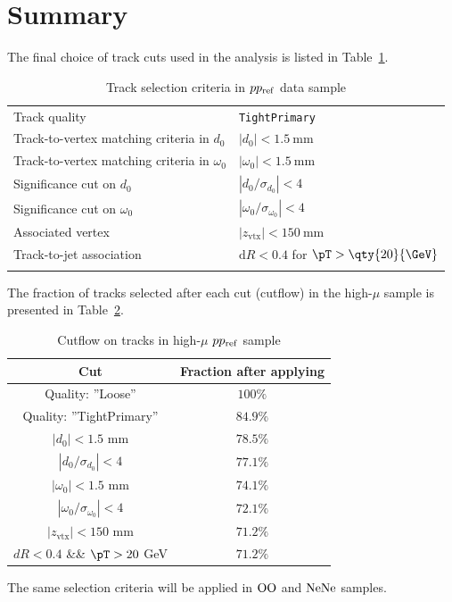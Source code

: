 \section{Summary}
The final choice of track cuts used in the analysis is listed in Table~\ref{tab:tab_cuts}.
\begin{table}[ht!]
  \caption{Track selection criteria in $pp_{\mathrm{ref}}$ data sample}%
  \label{tab:track_sel_pprefSample}
  \centering
  \begin{tabular}{ll}
    \toprule
    Track quality    & \texttt{TightPrimary} \\
    Track-to-vertex matching criteria in $d_0$     & $|d_0| < \qty[parse-numbers=false]{1.5}{\mm}$ \\
    Track-to-vertex matching criteria in $\omega_0$     & $|\omega_0| < \qty[parse-numbers=false]{1.5}{\mm}$\\
    Significance cut on $d_0$                & $|d_0/\sigma_{d_0}| <4$ \\
    Significance cut on $\omega_0$                & $|\omega_0/\sigma_{\omega_0}| <4$ \\
    Associated vertex                & $|z_\text{vtx}| < \qty{150}{\mm}$ \\
    Track-to-jet association        & \(\mathrm{d}R < 0.4\) for $\pT>\qty{20}{\GeV}$ \\
    \bottomrule
    \label{tab:tab_cuts}
  \end{tabular}
\end{table}
The fraction of tracks selected after each cut (cutflow) in the high-$\mu$ sample is presented in Table~\ref{tab:cutflow_highmu}.
\begin{table}[h]
    \centering
    \caption{Cutflow on tracks in high-$\mu$ $pp_{\mathrm{ref}}$ sample}
    \begin{tabular}{c|c}
    Cut & Fraction after applying \\
    \hline
    Quality: ''Loose'' & $100\%$ \\
    Quality: ''TightPrimary'' & $84.9\%$ \\
    $|d_0| < 1.5$ mm & $78.5\%$ \\
    $|d_0/\sigma_{d_0}| < 4$ & $77.1\%$ \\
    $|\omega_0| < 1.5$ mm & $74.1\%$ \\
    $|\omega_0/\sigma_{\omega_0}| < 4$ & $72.1\%$ \\
    $|z_\text{vtx}| < 150$ mm & $71.2\%$ \\
    $dR<0.4$ \&\& $\pT>20$ GeV & $71.2\%$ \\
    \end{tabular}
    \label{tab:cutflow_highmu}
\end{table}
The same selection criteria will be applied in $\text{OO}$ and $\text{NeNe}$ samples. 

